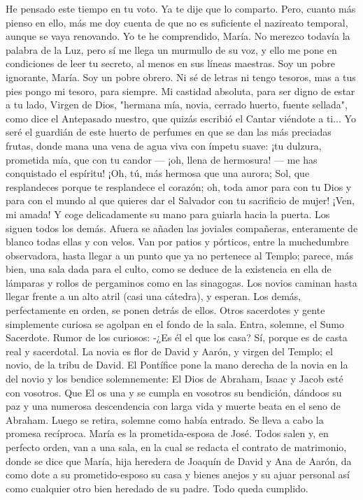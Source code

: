 \documentclass[12pt]{book} %
\begin{document}
He pensado este tiempo en tu voto. Ya te dije que lo comparto. Pero, cuanto más pienso en ello, más me doy cuenta de que no es suficiente el nazireato temporal, aunque se vaya renovando. Yo te he comprendido, María. No merezco todavía la palabra de la Luz, pero sí me llega un murmullo de su voz, y ello me pone en condiciones de leer tu secreto, al menos en sus líneas maestras. Soy un pobre ignorante, María. Soy un pobre obrero. Ni sé de letras ni tengo tesoros, mas a tus pies pongo mi tesoro, para siempre. Mi castidad absoluta, para ser digno de estar a tu lado, Virgen de Dios, "hermana mía, novia, cerrado huerto, fuente sellada", como dice el Antepasado nuestro, que quizás escribió el Cantar viéndote a ti... Yo seré el guardián de este huerto de perfumes en que se dan las más preciadas frutas, donde mana una vena de agua viva con ímpetu suave: ¡tu dulzura, prometida mía, que con tu candor — ¡oh, llena de hermosura! — me has conquistado el espíritu! ¡Oh, tú, más hermosa que una aurora; Sol, que resplandeces porque te resplandece el corazón; oh, toda amor para con tu Dios y para con el mundo al que quieres dar el Salvador con tu sacrificio de mujer! ¡Ven, mi amada! 
Y coge delicadamente su mano para guiarla hacia la puerta. 
Los siguen todos los demás. Afuera se añaden las joviales compañeras, enteramente de blanco todas ellas y con velos. 
Van por patios y pórticos, entre la muchedumbre observadora, hasta llegar a un punto que ya no pertenece al Templo; 
parece, más bien, una sala dada para el culto, como se deduce de la existencia en ella de lámparas y rollos de pergaminos como en las sinagogas. Los novios caminan hasta llegar frente a un alto atril (casi una cátedra), y esperan. Los demás, perfectamente en orden, se ponen detrás de ellos. Otros sacerdotes y gente simplemente curiosa se agolpan en el fondo de la sala. Entra, solemne, el Sumo Sacerdote. Rumor de los curiosos: -¿Es él el que los casa? 
Sí, porque es de casta real y sacerdotal. La novia es flor de David y Aarón, y virgen del Templo; el novio, de la tribu de David. 
El Pontífice pone la mano derecha de la novia en la del novio y los bendice solemnemente: 
El Dios de Abraham, Isaac y Jacob esté con vosotros. Que El os una y se cumpla en vosotros su bendición, dándoos su paz y una numerosa descendencia con larga vida y muerte beata en el seno de Abraham. 
Luego se retira, solemne como había entrado. 
Se lleva a cabo la promesa recíproca. María es la prometida-esposa de José. 
Todos salen y, en perfecto orden, van a una sala, en la cual se redacta el contrato de matrimonio, donde se dice que María, hija heredera de Joaquín de David y Ana de Aarón, da como dote a su prometido-esposo su casa y bienes anejos y su ajuar personal así como cualquier otro bien heredado de su padre. Todo queda cumplido. 
\end{document}
